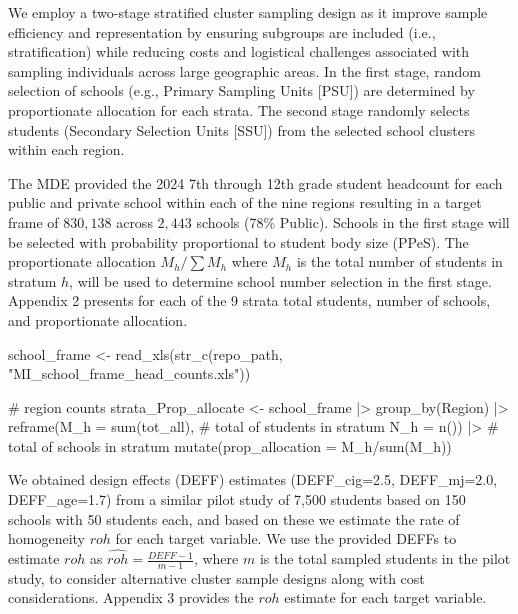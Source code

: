 \documentclass[
  12pt]{article}
\newenvironment{Shaded}{\begin{snugshade}}{\end{snugshade}}
\newcommand{\AttributeTok}[1]{\textcolor[rgb]{0.40,0.45,0.13}{#1}}
\newcommand{\CommentTok}[1]{\textcolor[rgb]{0.37,0.37,0.37}{#1}}
\newcommand{\FunctionTok}[1]{\textcolor[rgb]{0.28,0.35,0.67}{#1}}
\newcommand{\NormalTok}[1]{\textcolor[rgb]{0.00,0.23,0.31}{#1}}
\newcommand{\OtherTok}[1]{\textcolor[rgb]{0.00,0.23,0.31}{#1}}
\newcommand{\SpecialCharTok}[1]{\textcolor[rgb]{0.37,0.37,0.37}{#1}}
\newcommand{\StringTok}[1]{\textcolor[rgb]{0.13,0.47,0.30}{#1}}
\begin{document}
We employ a two-stage stratified cluster sampling design as it improve
sample efficiency and representation by ensuring subgroups are included
(i.e., stratification) while reducing costs and logistical challenges
associated with sampling individuals across large geographic areas. In
the first stage, random selection of schools (e.g., Primary Sampling
Units {[}PSU{]}) are determined by proportionate allocation for each
strata. The second stage randomly selects students (Secondary Selection
Units {[}SSU{]}) from the selected school clusters within each region.

The MDE provided the 2024 7th through 12th grade student headcount for
each public and private school within each of the nine regions resulting
in a target frame of \(830,138\) across \(2,443\) schools (78\% Public).
Schools in the first stage will be selected with probability
proportional to student body size (PPeS). The proportionate allocation
\(M_h / \sum M_h\) where \(M_h\) is the total number of students in
stratum \(h\), will be used to determine school number selection in the
first stage. Appendix 2 presents for each of the 9 strata total
students, number of schools, and proportionate allocation.

\begin{Shaded}
\begin{Highlighting}[]
\NormalTok{school\_frame }\OtherTok{\textless{}{-}} \FunctionTok{read\_xls}\NormalTok{(}\FunctionTok{str\_c}\NormalTok{(repo\_path, }\StringTok{"MI\_school\_frame\_head\_counts.xls"}\NormalTok{))}


\CommentTok{\# region counts}
\NormalTok{strata\_Prop\_allocate }\OtherTok{\textless{}{-}}\NormalTok{ school\_frame }\SpecialCharTok{|\textgreater{}} 
  \FunctionTok{group\_by}\NormalTok{(Region) }\SpecialCharTok{|\textgreater{}} 
  \FunctionTok{reframe}\NormalTok{(}\AttributeTok{M\_h =} \FunctionTok{sum}\NormalTok{(tot\_all), }\CommentTok{\# total of students in stratum}
         \AttributeTok{N\_h =} \FunctionTok{n}\NormalTok{()) }\SpecialCharTok{|\textgreater{}} \CommentTok{\# total of schools in stratum}
  \FunctionTok{mutate}\NormalTok{(}\AttributeTok{prop\_allocation =}\NormalTok{ M\_h}\SpecialCharTok{/}\FunctionTok{sum}\NormalTok{(M\_h)) }
\end{Highlighting}
\end{Shaded}

We obtained design effects (DEFF) estimates (DEFF\_cig=2.5,
DEFF\_mj=2.0, DEFF\_age=1.7) from a similar pilot study of 7,500
students based on 150 schools with 50 students each, and based on these
we estimate the rate of homogeneity \(roh\) for each target variable. We
use the provided DEFFs to estimate \(roh\) as
\(\hat{roh} = \frac{DEFF-1}{m-1}\), where \(m\) is the total sampled
students in the pilot study, to consider alternative cluster sample
designs along with cost considerations. Appendix 3 provides the \(roh\)
estimate for each target variable.
\end{document}
